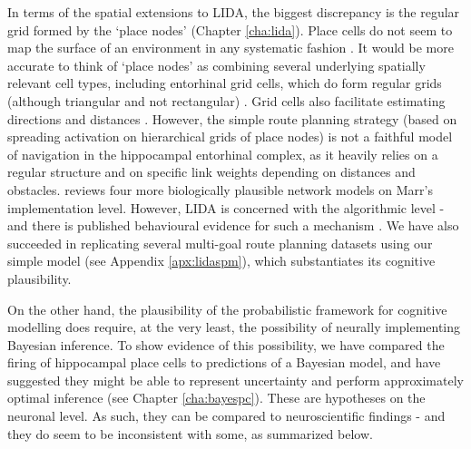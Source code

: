 In terms of the spatial extensions to LIDA, the biggest discrepancy is the regular grid formed by the `place nodes' (Chapter \ref{cha:lida}). Place cells do not seem to map the surface of an environment in any systematic fashion \citep{o1998place}. It would be more accurate to think of `place nodes' as combining several underlying spatially relevant cell types, including entorhinal grid cells, which do form regular grids (although triangular and not rectangular) \citep{moser2008place}. Grid cells also facilitate estimating directions and distances \citep{bush2015using}. However, the simple route planning strategy (based on spreading activation on hierarchical grids of place nodes) is not a faithful model of navigation in the hippocampal entorhinal complex, as it heavily relies on a regular structure and on specific link weights depending on distances and obstacles. \cite{bush2015using} reviews four more biologically plausible network models on Marr's implementation level. However, LIDA is concerned with the algorithmic level - and there is published behavioural evidence for such a mechanism \citep{mueller2013pathfinding}. We have also succeeded in replicating several multi-goal route planning datasets using our simple model (see Appendix \ref{apx:lidaspm}), which substantiates its cognitive plausibility. 

On the other hand, the plausibility of the probabilistic framework for cognitive modelling does require, at the very least, the possibility of neurally implementing Bayesian inference. To show evidence of this possibility, we have compared the firing of hippocampal place cells to predictions of a Bayesian model, and have suggested they might be able to represent uncertainty and perform approximately optimal inference (see Chapter \ref{cha:bayespc}). These are hypotheses on the neuronal level. As such, they can be compared to neuroscientific findings - and they do seem to be inconsistent with some, as summarized below.

